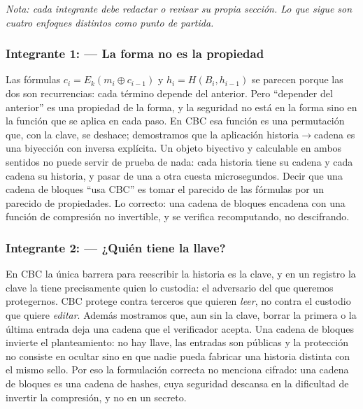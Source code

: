 \documentclass[11pt,letterpaper]{article}
\newcommand{\xor}{\oplus}
\begin{document}
\emph{Nota: cada integrante debe redactar o revisar su propia sección. Lo que sigue son cuatro enfoques distintos
como punto de partida.}

\subsubsection*{Integrante 1: \underline{\hspace{4cm}} --- La forma no es la propiedad}
Las fórmulas $c_i = E_k(m_i\xor c_{i-1})$ y $h_i = H(B_i, h_{i-1})$ se parecen porque las dos son recurrencias: cada
término depende del anterior. Pero ``depender del anterior'' es una propiedad de la forma, y la seguridad no está en
la forma sino en la función que se aplica en cada paso. En CBC esa función es una permutación que, con la clave, se
deshace; demostramos que la aplicación historia$\to$cadena es una biyección con inversa explícita. Un objeto
biyectivo y calculable en ambos sentidos no puede servir de prueba de nada: cada historia tiene su cadena y cada
cadena su historia, y pasar de una a otra cuesta microsegundos. Decir que una cadena de bloques ``usa CBC'' es tomar
el parecido de las fórmulas por un parecido de propiedades. Lo correcto: una cadena de bloques encadena con una
función de compresión no invertible, y se verifica recomputando, no descifrando.

\subsubsection*{Integrante 2: \underline{\hspace{4cm}} --- ¿Quién tiene la llave?}
En CBC la única barrera para reescribir la historia es la clave, y en un registro la clave la tiene precisamente quien
lo custodia: el adversario del que queremos protegernos. CBC protege contra terceros que quieren \emph{leer}, no contra
el custodio que quiere \emph{editar}. Además mostramos que, aun sin la clave, borrar la primera o la última entrada
deja una cadena que el verificador acepta. Una cadena de bloques invierte el planteamiento: no hay llave, las entradas
son públicas y la protección no consiste en ocultar sino en que nadie pueda fabricar una historia distinta con el mismo
sello. Por eso la formulación correcta no menciona cifrado: una cadena de bloques es una cadena de hashes, cuya
seguridad descansa en la dificultad de invertir la compresión, y no en un secreto.
\end{document}
